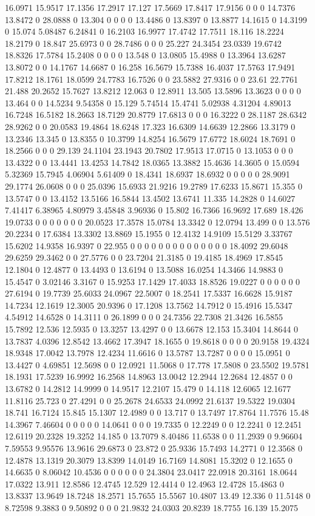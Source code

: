 16.0971 15.9517 17.1356 17.2917 17.127 17.5669 17.8417 17.9156 0 0 0 14.7376 13.8472 0 28.0888 0 13.304 0 0 0 0 13.4486 0 13.8397 0 13.8877 14.1615 0 14.3199 0 15.074 5.08487 6.24841 0 16.2103 16.9977 17.4742 17.7511 18.116 18.2224 18.2179 0 18.847 25.6973 0 0 28.7486 0 0 0 25.227 24.3454 23.0339 19.6742 18.8326 17.5784 15.2408 0 0 0 0 13.548 0 13.0805 15.4988 0 13.3964 13.6287 13.8072 0 0 14.1767 14.6687 0 16.258 16.5679 15.7388 16.4037 17.5763 17.9491 17.8212 18.1761 18.0599 24.7783 16.7526 0 0 23.5882 27.9316 0 0 23.61 22.7761 21.488 20.2652 15.7627 13.8212 12.063 0 12.8911 13.505 13.5896 13.3623 0 0 0 0 13.464 0 0 14.5234 9.54358 0 15.129 5.74514 15.4741 5.02938 4.31204 4.89013 16.7248 16.5182 18.2663 18.7129 20.8779 17.6813 0 0 0 16.3222 0 28.1187 28.6342 28.9262 0 0 20.0583 19.4864 18.6248 17.323 16.6309 14.6639 12.2866 13.3179 0 13.2346 13.345 0 13.8355 0 10.3799 14.8254 16.5679 17.6772 18.6024 18.7691 0 18.2566 0 0 0 29.139 24.1104 23.1943 20.7802 17.9513 17.0715 0 13.1053 0 0 0 13.4322 0 0 13.4441 13.4253 14.7842 18.0365 13.3882 15.4636 14.3605 0 15.0594 5.32369 15.7945 4.06904 5.61409 0 18.4341 18.6937 18.6932 0 0 0 0 0 28.9091 29.1774 26.0608 0 0 0 25.0396 15.6933 21.9216 19.2789 17.6233 15.8671 15.355 0 13.5747 0 0 13.4152 13.5166 16.5844 13.4502 13.6741 11.335 14.2828 0 14.6027 7.41417 6.38965 4.80979 3.45848 3.96936 0 15.802 16.7366 16.9692 17.689 18.426 19.0733 0 0 0 0 0 0 0 20.0523 17.3578 15.0784 13.3342 0 12.0794 13.499 0 0 13.576 20.2234 0 17.6384 13.3302 13.8869 15.1955 0 12.4132 14.9109 15.5129 3.33767 15.6202 14.9358 16.9397 0 22.955 0 0 0 0 0 0 0 0 0 0 0 0 0 0 18.4092 29.6048 29.6259 29.3462 0 0 27.5776 0 0 23.7204 21.3185 0 19.4185 18.4969 17.8545 12.1804 0 12.4877 0 13.4493 0 13.6194 0 13.5088 16.0254 14.3466 14.9883 0 15.4547 0 3.02146 3.3167 0 15.9253 17.1429 17.4033 18.8526 19.0227 0 0 0 0 0 0 27.6194 0 19.7739 25.6033 24.0967 22.5007 0 18.2541 17.5337 16.6628 15.9187 14.7234 12.1619 12.3005 20.9396 0 17.1208 13.7562 14.7912 0 15.4916 15.5347 4.54912 14.6528 0 14.3111 0 26.1899 0 0 0 24.7356 22.7308 21.3426 16.5855 15.7892 12.536 12.5935 0 13.3257 13.4297 0 0 13.6678 12.153 15.3404 14.8644 0 13.7837 4.0396 12.8542 13.4662 17.3947 18.1655 0 19.8618 0 0 0 0 20.9158 19.4324 18.9348 17.0042 13.7978 12.4234 11.6616 0 13.5787 13.7287 0 0 0 0 15.0951 0 13.4427 0 4.69851 12.5698 0 0 12.0921 11.5068 0 17.778 17.5808 0 23.5502 19.5781 18.1931 17.5239 16.9992 16.2568 14.8963 13.0042 12.2944 12.2684 12.4857 0 0 13.6782 0 14.2812 14.9999 0 14.9517 12.2107 15.479 0 14.118 12.6065 12.1677 11.8116 25.723 0 27.4291 0 0 25.2678 24.6533 24.0992 21.6137 19.5322 19.0304 18.741 16.7124 15.845 15.1307 12.4989 0 0 13.717 0 13.7497 17.8764 11.7576 15.48 14.3967 7.46604 0 0 0 0 0 14.0641 0 0 0 19.7335 0 12.2249 0 0 12.2241 0 12.2451 12.6119 20.2328 19.3252 14.185 0 13.7079 8.40486 11.6538 0 0 11.2939 0 9.96604 7.59553 9.95576 13.9616 29.6873 0 23.872 0 25.9336 15.7493 14.2771 0 12.3568 0 12.4878 13.1319 20.3079 13.8399 14.0149 16.7169 14.8081 15.3202 0 12.1655 0 14.6635 0 8.06042 10.4536 0 0 0 0 0 0 24.3804 23.0417 22.0918 20.3161 18.0644 17.0322 13.911 12.8586 12.4745 12.529 12.4414 0 12.4963 12.4728 15.4863 0 13.8337 13.9649 18.7248 18.2571 15.7655 15.5567 10.4807 13.49 12.336 0 11.5148 0 8.72598 9.3883 0 9.50892 0 0 0 21.9832 24.0303 20.8239 18.7755 16.139 15.2075 